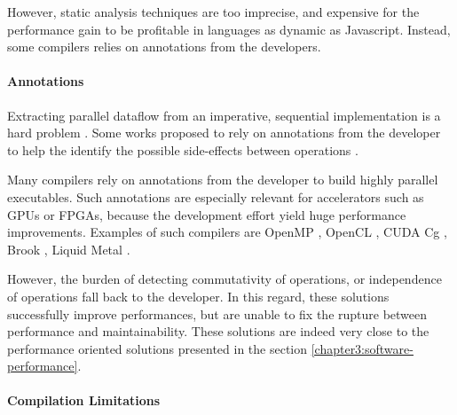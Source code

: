 However, static analysis techniques are too imprecise, and expensive for the performance gain to be profitable in languages as dynamic as Javascript.
Instead, some compilers relies on annotations from the developers.

\paragraph{Annotations}

Extracting parallel dataflow from an imperative, sequential implementation is a hard problem \cite{Johnston2004a}.
Some works proposed to rely on annotations from the developer to help the identify the possible side-effects between operations \cite{Vandierendonck2010a,Fernandez2014a}.

Many compilers rely on annotations from the developer to build highly parallel executables.
Such annotations are especially relevant for accelerators such as GPUs or FPGAs, because the development effort yield huge performance improvements.
Examples of such compilers are OpenMP \cite{Dagum1998}, OpenCL \cite{Stone2010}, CUDA \cite{Nvidia2007} Cg \cite{Mark2003}, Brook \cite{Buck2004}, Liquid Metal \cite{Huang2008}.

However, the burden of detecting commutativity of operations, or independence of operations fall back to the developer.
In this regard, these solutions successfully improve performances, but are unable to fix the rupture between performance and maintainability.
These solutions are indeed very close to the performance oriented solutions presented in the section \ref{chapter3:software-performance}.



\paragraph{Compilation Limitations}

